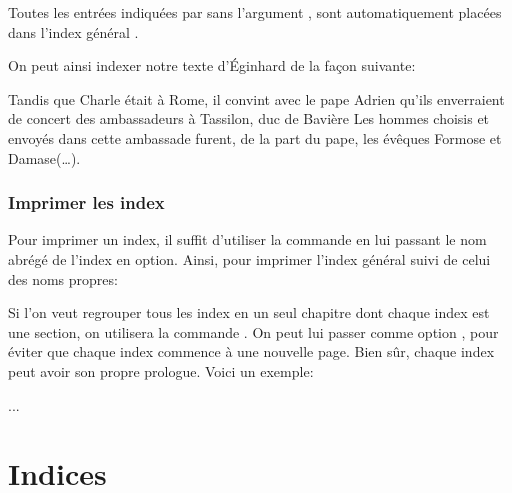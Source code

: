 \begin{plusloins}
Toutes les entrées indiquées  par  sans l'argument , sont automatiquement placées dans l'index général .
\end{plusloins}

On peut ainsi indexer notre texte d'Éginhard de la façon suivante:

\begin{latexcode}
Tandis que Charle était à Rome, il convint
avec le pape Adrien qu’ils enverraient de concert
des ambassadeurs à Tassilon, duc de Bavière
\textelp{}
Les hommes choisis et envoyés dans cette ambassade furent, de 
la part du pape, les évêques Formose et 
Damase(…).
\end{latexcode}



\subsection{Imprimer les index}

Pour imprimer un index, il suffit d'utiliser la commande  en lui passant le nom abrégé de l'index en option. Ainsi, pour imprimer l'index général suivi de celui des noms propres:

\begin{latexcode}
\printindex
\printindex[npr]
\end{latexcode}


\begin{plusloins}
Si l'on veut regrouper tous les index en un seul chapitre dont chaque index est une section, on utilisera   la commande . On peut lui passer comme option , pour  éviter que chaque index commence à une nouvelle page. Bien sûr, chaque index peut avoir son propre prologue. Voici un exemple: 
\begin{latexcode}
... 
\chapter*{Indices}
\printindex

\printindex[npr] 
\end{latexcode}
\end{plusloins}

